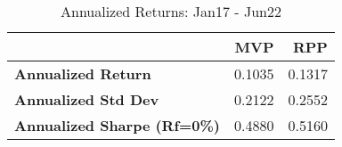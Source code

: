 \begin{table}[!htb]
	\centering
	\begingroup
	\fontsize{9}{9}
	\selectfont
	\begin{tabular}{lrr}
		\toprule
		                                    & MVP    & RPP    \\
		\midrule
		\textbf{Annualized Return}          & 0.1035 & 0.1317 \\
		\textbf{Annualized Std Dev}         & 0.2122 & 0.2552 \\
		\textbf{Annualized Sharpe (Rf=0\%)} & 0.4880 & 0.5160 \\
		\bottomrule
	\end{tabular} \caption{Annualized Returns: Jan17 - Jun22}
	\label{tab: volHighLow }
	\endgroup{}
\end{table}